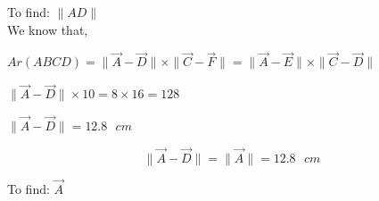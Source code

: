 \documentclass[letterpaper,12pt]{article}
\begin{document}
\clearpage

To find: $\|AD\|$ \\

We know that,
\begin{center}
    $Ar(ABCD) = \|\Vec{A}-\Vec{D}\|\times\|\Vec{C}-\Vec{F}\| = \|\Vec{A}-\Vec{E}\|\times\|\Vec{C}-\Vec{D}\|$ \\
\end{center}
\begin{center}
    $\|\Vec{A}-\Vec{D}\| \times 10 = 8 \times 16 = 128$
\end{center}
\begin{center}
    $\|\Vec{A}-\Vec{D}\| = 12.8 \text{ } cm$
\end{center}
\begin{equation}
\nonumber
    \|\Vec{A} - \Vec{D}\| = \|\Vec{A}\| = 12.8 \text{ } cm
\end{equation}

To find: $\Vec{A}$ \\
\end{document}
